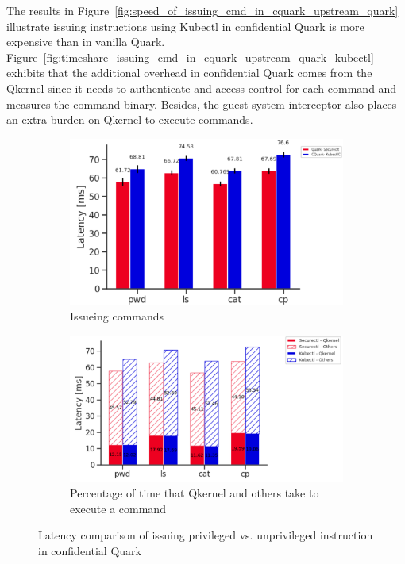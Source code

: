 The results in Figure~\ref{fig:speed_of_issuing_cmd_in_cquark_upstream_quark} illustrate issuing instructions using Kubectl in confidential Quark is more expensive than in vanilla Quark. Figure~\ref{fig:timeshare_issuing_cmd_in_cquark_upstream_quark_kubectl} exhibits that the additional overhead in confidential Quark comes from the Qkernel since it needs to authenticate and access control for each 
command and measures the command binary. Besides, the guest system interceptor also places an extra burden on Qkernel to execute commands.



\begin{figure}[!htb] 
    \begin{subfigure}[b]{0.5\linewidth}
      \centering
      \centering
      \includegraphics[width=1\textwidth]{images/speed_of_issuing_cmd_in_cquark_kubctl_securectl.png} %
      \caption{Issueing commands}
      \label{fig:speed_of_issuing_cmd_in_cquark_kubctl_securectl}
      \vspace{4ex}
    \end{subfigure}%
    \begin{subfigure}[b]{0.5\linewidth}
      \centering
      \includegraphics[width=1\textwidth]{images/timeshare_issuing_cmd_in_cquark_kubectl_securectl.png} %
      \caption{Percentage of time that Qkernel and others take to execute a command}
      \label{fig:timeshare_issuing_cmd_in_cquark_kubectl_securectl}
      \vspace{4ex}
    \end{subfigure} 
    \caption{Latency comparison of issuing privileged vs. unprivileged instruction in confidential Quark}
    \label{fig9} 
\end{figure}



